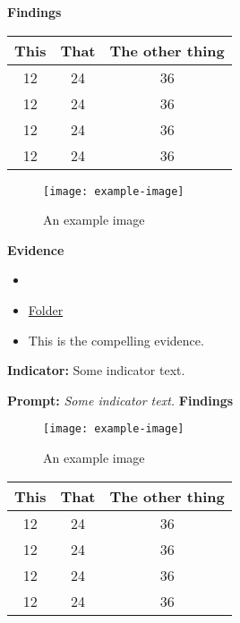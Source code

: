 \documentclass{report}
\newenvironment{findings}
{\begin{findingsBox}
\noindent\textbf{Findings}
}
{
\end{findingsBox}
}
\newenvironment{evidence}
{\begin{evidenceBox}
\noindent\textbf{Evidence}
}
{
\end{evidenceBox}
}
\begin{document}
\begin{findings}%

\blindtext

\begin{table}[!h]
\begin{tabular}{c | c || c}
This & That & The other thing \\
\hline
12   &  24  &  36 \\
12   &  24  &  36 \\
12   &  24  &  36 \\
12   &  24  &  36 \\
\end{tabular}
\end{table}


\blindtext

\begin{figure}[h!]
\caption[An example image]{An example image}
\centering
\texttt{[image: example-image]}
\end{figure}
\end{findings}
\begin{evidence}
\vspace{-\topsep}%

\begin{itemize}[leftmargin=*]
\setlength{\parskip}{0pt}
\setlength{\itemsep}{0pt plus 1pt}
\item \blindtext
\item \href{https://drive.google.com/a/cmis.ac.th/folderview?id=0ByVFfrm0zfolWE0yenprdktGVlk&usp=sharing}{Folder}
\item This is the compelling evidence.
\end{itemize}
\end{evidence}

\noindent\textbf{Indicator:} Some indicator text.

\noindent\textbf{Prompt:} \textit{Some indicator text.}
\noindent\textbf{Findings}

\blindtext

\begin{figure}[h!]
\caption[An example image]{An example image}
\centering
\texttt{[image: example-image]}
\end{figure}


\blindtext

\begin{table}[!h]
\begin{tabular}{c | c || c}
This & That & The other thing \\
\hline
12   &  24  &  36 \\
12   &  24  &  36 \\
12   &  24  &  36 \\
12   &  24  &  36 \\
\end{tabular}
\end{table}
\end{document}
